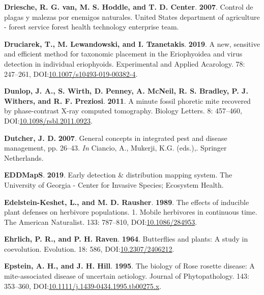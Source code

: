 \documentclass[12pt,final,CPage]{ufthesis}
\newlength{\cslhangindent}
\newenvironment{CSLReferences}[2] %
{%
	\setlength{\parindent}{0pt}
	\ifodd #1 \everypar{\setlength{\hangindent}{\cslhangindent}}\ignorespaces\fi
	\ifnum #2 > 0
	\setlength{\parskip}{#2\baselineskip}
	\fi
}%
{}
\begin{document}
{\begin{CSLReferences}{1}{0}
  \leavevmode{}%
  \textbf{Driesche, R. G. van, M. S. Hoddle, and T. D. Center}. \textbf{2007}. Control de plagas y malezas por enemigos naturales. {United States} department of agriculture - forest service forest health technology enterprise team.

  \leavevmode{}%
  \textbf{Druciarek, T., M. Lewandowski, and I. Tzanetakis}. \textbf{2019}. A new, sensitive and efficient method for taxonomic placement in the {Eriophyoidea} and virus detection in individual eriophyoids. Experimental and Applied Acarology. 78: 247--261, DOI:\href{https://doi.org/10.1007/s10493-019-00382-4}{10.1007/s10493-019-00382-4}.

  \leavevmode{}%
  \textbf{Dunlop, J. A., S. Wirth, D. Penney, A. McNeil, R. S. Bradley, P. J. Withers, and R. F. Preziosi}. \textbf{2011}. A minute fossil phoretic mite recovered by phase-contrast {X-ray} computed tomography. Biology Letters. 8: 457--460, DOI:\href{https://doi.org/10.1098/rsbl.2011.0923}{10.1098/rsbl.2011.0923}.

  \leavevmode{}%
  \textbf{Dutcher, J. D.} \textbf{2007}. General concepts in integrated pest and disease management, pp. 26--43. \emph{In} Ciancio, A., Mukerji, K.G. (eds.),. Springer Netherlands.

  \leavevmode{}%
  \textbf{EDDMapS}. \textbf{2019}. Early detection \& distribution mapping system. The University of Georgia - Center for Invasive Species; Ecosystem Health.

  \leavevmode{}%
  \textbf{Edelstein-Keshet, L., and M. D. Rausher}. \textbf{1989}. The effects of inducible plant defenses on herbivore populations. 1. Mobile herbivores in continuous time. The American Naturalist. 133: 787--810, DOI:\href{https://doi.org/10.1086/284953}{10.1086/284953}.

  \leavevmode{}%
  \textbf{Ehrlich, P. R., and P. H. Raven}. \textbf{1964}. Butterflies and plants: A study in coevolution. Evolution. 18: 586, DOI:\href{https://doi.org/10.2307/2406212}{10.2307/2406212}.

  \leavevmode{}%
  \textbf{Epstein, A. H., and J. H. Hill}. \textbf{1995}. The biology of {Rose rosette disease}: A mite-associated disease of uncertain aetiology. Journal of Phytopathology. 143: 353--360, DOI:\href{https://doi.org/10.1111/j.1439-0434.1995.tb00275.x}{10.1111/j.1439-0434.1995.tb00275.x}.


\end{CSLReferences}}
\end{document}
